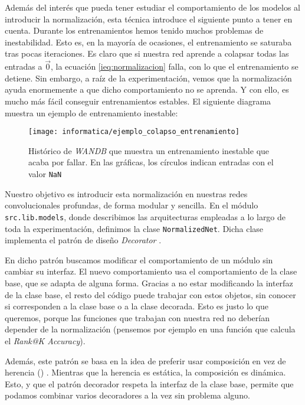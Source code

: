 Además del interés que pueda tener estudiar el comportamiento de los modelos al introducir la normalización, esta técnica introduce el siguiente punto a tener en cuenta. Durante los entrenamientos hemos tenido muchos problemas de inestabilidad. Esto es, en la mayoría de ocasiones, el entrenamiento se saturaba tras pocas iteraciones. Es claro que si nuestra red aprende a colapsar todas las entradas a $\vec{0}$, la ecuación \eqref{ieq:normalizacion} falla, con lo que el entrenamiento se detiene. Sin embargo, a raíz de la experimentación, vemos que la normalización ayuda enormemente a que dicho comportamiento no se aprenda. Y con ello, es mucho más fácil conseguir entrenamientos estables. El siguiente diagrama muestra un ejemplo de entrenamiento inestable:

\begin{figure}[H]
    \centering
    \texttt{[image: informatica/ejemplo\_colapso\_entrenamiento]}
    \caption{Histórico de \textit{WANDB} que muestra un entrenamiento inestable que acaba por fallar. En las gráficas, los círculos indican entradas con el valor \lstinline{NaN}}
\end{figure}

Nuestro objetivo es introducir esta normalización en nuestras redes convolucionales profundas, de forma modular y sencilla. En el módulo \lstinline{src.lib.models}, donde describimos las arquitecturas empleadas a lo largo de toda la experimentación, definimos la clase \lstinline{NormalizedNet}. Dicha clase implementa el patrón de diseño \textit{Decorator} \cite{informatica:design_patterns} \cite{informatica:decorator_pattern}.

En dicho patrón buscamos modificar el comportamiento de un módulo sin cambiar su interfaz. El nuevo comportamiento usa el comportamiento de la clase base, que se adapta de alguna forma. Gracias a no estar modificando la interfaz de la clase base, el resto del código puede trabajar con estos objetos, sin conocer si corresponden a la clase base o a la clase decorada. Esto es justo lo que queremos, porque las funciones que trabajan con nuestra red no deberían depender de la normalización (pensemos por ejemplo en una función que calcula el \textit{Rank@K Accuracy}).

Además, este patrón se basa en la idea de preferir usar composición en vez de herencia () \cite{informatica:comp_over_inh}. Mientras que la herencia es estática, la composición es dinámica. Esto, y que el patrón decorador respeta la interfaz de la clase base, permite que podamos combinar varios decoradores a la vez sin problema alguno.

